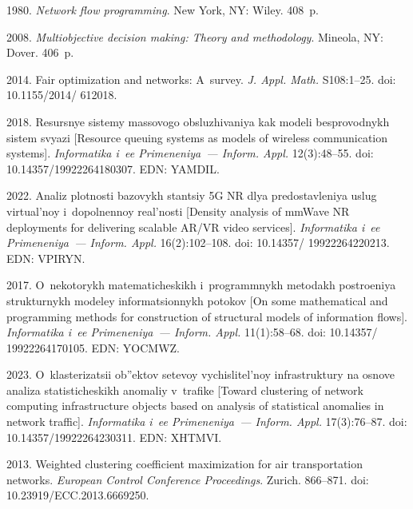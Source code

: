 \begin{multicols}{2}
{{\begin{thebibliography}{99}
 1980. 
\textit{Network flow programming}. New York, NY: Wiley. 408~p.



 2008.
\textit{Multiobjective decision making: Theory and methodology}. Mineola, NY: Dover. 406~p. 

 2014. 
Fair optimization and networks: A~survey. 
\textit{J. Appl. Math.} S108:1--25.
doi: 10.1155/2014/ 612018.

 2018. 
Resursnye sistemy massovogo obsluzhivaniya kak modeli besprovodnykh sistem svyazi [Resource queuing systems as models of wireless communication systems].
\textit{Informatika i~ee Primeneniya~--- Inform. Appl.} 12(3):48--55.
doi: 10.14357/19922264180307. EDN: YAMDIL.

 2022.
Ana\-liz plotnosti bazovykh stantsiy 5G NR dlya predostav\-le\-niya uslug vir\-tu\-al'\-noy i~do\-pol\-nen\-noy real'\-nosti 
[Density analysis of mmWave NR deployments for delivering scalable AR/VR video services].
\textit{Informatika i~ee Primeneniya~--- Inform. Appl.} 16(2):102--108.
doi: 10.14357/ 19922264220213. EDN: VPIRYN.



 2017.
O~nekotorykh matematicheskikh i~programmnykh metodakh postroeniya strukturnykh mo\-de\-ley informatsionnykh potokov
 [On some mathematical and programming methods for construction of structural models of information flows].
\textit{Informatika i~ee Primeneniya~--- Inform. Appl.} 11(1):58--68.    
doi: 10.14357/ 19922264170105. EDN: YOCMWZ.

 2023. 
O~klasterizatsii ob''ektov setevoy vychislitel'noy infra\-struk\-tu\-ry na osnove analiza statisticheskikh ano\-ma\-liy v~trafike 
[Toward clustering of network computing infrastructure objects based on analysis of statistical anomalies in network traffic].
\textit{Informatika i~ee Primeneniya~--- Inform. Appl.} 17(3):76--87.
doi: 10.14357/19922264230311. EDN: XHTMVI.

 2013.
Weighted clustering coefficient maximization for air transportation networks.
\textit{European Control Conference Proceedings}. Zurich. 866--871.
doi: 10.23919/ECC.2013.6669250.


\end{thebibliography}}}
\end{multicols}
